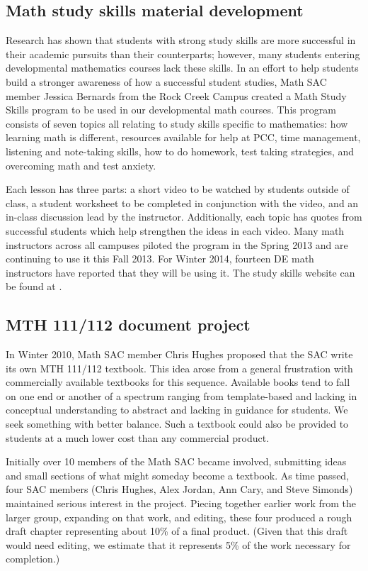 \subsection{Math study skills material development}\label{cur:sub:studyskills}
Research has shown that students with strong study skills are more successful in
their academic pursuits than their counterparts; however, many
students entering developmental mathematics courses lack these skills.
In an effort to help students build a stronger awareness of how a successful
student studies, Math SAC member Jessica Bernards from the Rock Creek Campus
created a Math Study Skills program to be used in our developmental math
courses.  This program consists of seven topics all relating to study skills
specific to mathematics: how learning math is different, resources available for
help at PCC, time management, listening and note-taking skills, how to do
homework, test taking strategies, and overcoming math and test anxiety.

Each lesson has three parts: a short video to be watched by students
outside of class, a student worksheet to be completed in conjunction with the
video, and an in-class discussion lead by the instructor. Additionally, each
topic has quotes from successful students which help strengthen the ideas in
each video.  Many math instructors across all campuses piloted the program in
the Spring 2013 and are continuing to use it this Fall 2013. For Winter 2014,
fourteen DE math instructors have reported that they will be using it. The study
skills website can be found at \cite{studyskills}.

\subsection{MTH 111/112 document project}\label{cur:sec:111/112doc}
In Winter 2010, Math SAC member Chris Hughes proposed that the SAC write its own
MTH 111/112 textbook. This idea arose from a general frustration with
commercially available textbooks for this sequence.  Available books tend to
fall on one end or another of a spectrum ranging from template-based and lacking
in conceptual understanding to abstract and lacking in guidance for students.
We seek something with better balance.  Such a
textbook could also be provided to students at a much lower cost than any commercial
product.

Initially over 10 members of the Math SAC became involved, submitting ideas and
small sections of what might someday become a textbook.  As time passed, four
SAC members (Chris Hughes, Alex Jordan, Ann Cary, and Steve Simonds) maintained
serious interest in the project.  Piecing together earlier work from the larger
group, expanding on that work, and editing, these four produced a rough draft
chapter representing about 10\% of a final product. (Given that this draft would
need editing, we estimate that it represents 5\% of the work necessary for
completion.)

